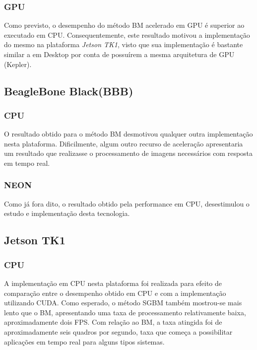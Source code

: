 \subsubsection{GPU}

Como previsto, o desempenho do método BM acelerado em GPU é superior ao executado em CPU. Consequentemente, este resultado motivou a implementação do mesmo na plataforma \textit{Jetson TK1}, visto que sua implementação é bastante similar a em Desktop por conta de possuírem a mesma arquitetura de GPU (Kepler).  


\subsection{BeagleBone Black(BBB)}
\subsubsection{CPU}

O resultado obtido para o método BM desmotivou qualquer outra implementação nesta plataforma. Dificilmente, algum outro recurso de aceleração apresentaria um resultado que realizasse o processamento de imagens necessários com resposta em tempo real. 

\subsubsection{NEON}
Como já fora dito, o resultado obtido pela performance em CPU, desestimulou o estudo e implementação desta tecnologia.


\subsection{Jetson TK1}
\subsubsection{CPU}
A implementação em CPU nesta plataforma foi realizada para efeito de comparação entre o desempenho obtido em CPU e com a implementação utilizando CUDA. Como esperado, o método SGBM também mostrou-se mais lento que o BM, apresentando uma taxa de processamento relativamente baixa, aproximadamente dois FPS. Com relação ao BM, a taxa atingida foi de aproximadamente seis quadros por segundo, taxa que começa a possibilitar aplicações em tempo real para alguns tipos sistemas.

